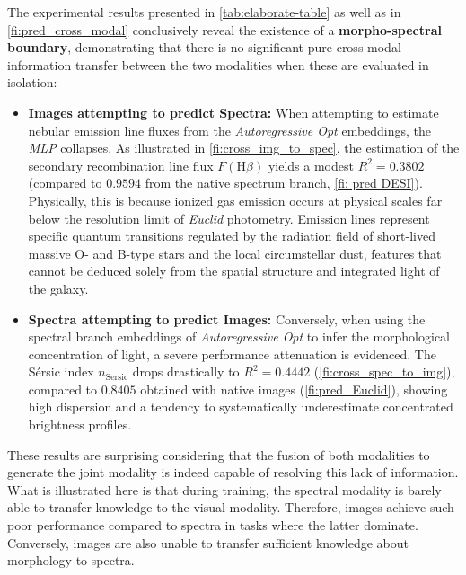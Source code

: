 The experimental results presented in \cref{tab:elaborate-table} as well as in \cref{fi:pred_cross_modal} conclusively reveal the existence of a \textbf{morpho-spectral boundary}, demonstrating that there is no significant pure cross-modal information transfer between the two modalities when these are evaluated in isolation:

\begin{itemize}
	\item \textbf{Images attempting to predict Spectra:} When attempting to estimate nebular emission line fluxes from the \textit{Autoregressive Opt} embeddings, the \textit{\gls{MLP}} collapses. As illustrated in \cref{fi:cross_img_to_spec}, the estimation of the secondary recombination line flux $F(\text{H}\beta)$ yields a modest $R^2 = 0.3802$ (compared to $0.9594$ from the native spectrum branch, \cref{fi: pred DESI}). Physically, this is because ionized gas emission occurs at physical scales far below the resolution limit of \textit{Euclid} photometry. Emission lines represent specific quantum transitions regulated by the radiation field of short-lived massive O- and B-type stars and the local circumstellar dust, features that cannot be deduced solely from the spatial structure and integrated light of the galaxy.
	
	\item \textbf{Spectra attempting to predict Images:} Conversely, when using the spectral branch embeddings of \textit{Autoregressive Opt} to infer the morphological concentration of light, a severe performance attenuation is evidenced. The Sérsic index $n_{\text{Sersic}}$ drops drastically to $R^2 = 0.4442$ (\cref{fi:cross_spec_to_img}), compared to $0.8405$ obtained with native images (\cref{fi:pred_Euclid}), showing high dispersion and a tendency to systematically underestimate concentrated brightness profiles.
\end{itemize}

These results are surprising considering that the fusion of both modalities to generate the joint modality is indeed capable of resolving this lack of information. What is illustrated here is that during training, the spectral modality is barely able to transfer knowledge to the visual modality. Therefore, images achieve such poor performance compared to spectra in tasks where the latter dominate. Conversely, images are also unable to transfer sufficient knowledge about morphology to spectra.

